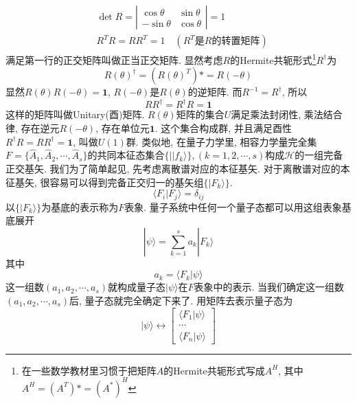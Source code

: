 \documentclass[a4paper,11pt]{book}
\newcommand{\A}{\hat{A}}
\begin{document}
\begin{equation*}
  \begin{split}
     &\det R=\left|\begin{array}{cc}
           \cos\theta & \sin\theta \\
           -\sin\theta & \cos\theta
         \end{array}\right|=1 \\
       &R^TR=RR^T=1\quad(R^T\text{是$R$的转置矩阵})
  \end{split}
\end{equation*}
满足第一行的正交矩阵叫做正当正交矩阵. 显然考虑$R$的Hermite共轭形式\footnote{在一些数学教材里习惯于把矩阵$A$的Hermite共轭形式写成$A^H$, 其中$A^H=(A^T)*=(A^*)^H$}$R^\dag$为
\begin{equation*}
  R(\theta)^\dag=(R(\theta)^T)*=R(-\theta)
\end{equation*}
显然$R(\theta)R(-\theta)=\mathbf{1}$, $R(-\theta)$是$R(\theta)$的逆矩阵. 而$R^{-1}=R^\dag$, 所以
\begin{equation*}
  RR^\dag=R^\dag R=\mathbf{1}
\end{equation*}
这样的矩阵叫做Unitary(酉)矩阵. $R(\theta)$矩阵的集合$U$满足乘法封闭性, 乘法结合律, 存在逆元$R(-\theta)$, 存在单位元$\mathbf{1}$. 这个集合构成群, 并且满足酉性$R^\dag R=RR^\dag=\mathbf{1}$, 叫做$U(1)$群.
类似地, 在量子力学里, 相容力学量完全集$F=\{\A_1,\A_2,\cdots,\A_s\}$的共同本征态集合$\{||f_k\rangle\},(k=1,2,\cdots,s)$构成$\mathcal{H}$的一组完备正交基矢. 我们为了简单起见, 先考虑离散谱对应的本征基矢. 对于离散谱对应的本征基矢, 很容易可以得到完备正交归一的基矢组$\{|F_k\rangle\}$.
\begin{equation*}
  \langle F_i|F_j\rangle=\delta_{ij}
\end{equation*}
以$\{|F_k\rangle\}$为基底的表示称为$F$表象. 量子系统中任何一个量子态都可以用这组表象基底展开
\begin{equation*}
  |\psi\rangle=\sum_{k=1}^{s}a_k|F_k\rangle
\end{equation*}
其中
\begin{equation*}
  a_k=\langle F_k|\psi\rangle
\end{equation*}
这一组数$(a_1,a_2,\cdots,a_s)$就构成量子态$|\psi\rangle$在$F$表象中的表示. 当我们确定这一组数$(a_1,a_2,\cdots,a_s)$后, 量子态就完全确定下来了. 用矩阵去表示量子态为
\begin{equation*}
  |\psi\rangle\longleftrightarrow\begin{bmatrix}
                          \langle F_1|\psi\rangle \\
                          \cdots \\
                          \langle F_n|\psi\rangle
                        \end{bmatrix}
\end{equation*}
\end{document}
